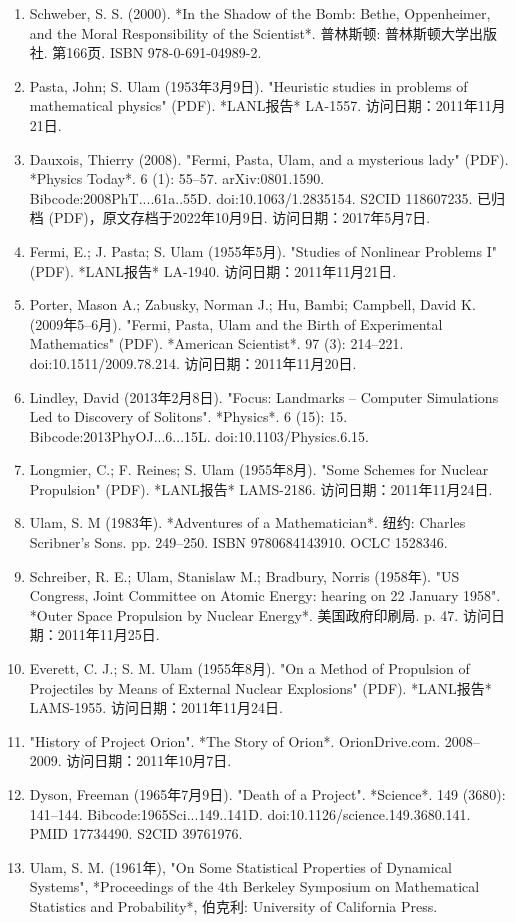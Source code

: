 \begin{enumerate}
\item Schweber, S. S. (2000). *In the Shadow of the Bomb: Bethe, Oppenheimer, and the Moral Responsibility of the Scientist*. 普林斯顿: 普林斯顿大学出版社. 第166页. ISBN 978-0-691-04989-2.
\item Pasta, John; S. Ulam (1953年3月9日). "Heuristic studies in problems of mathematical physics" (PDF). *LANL报告* LA-1557. 访问日期：2011年11月21日.
\item Dauxois, Thierry (2008). "Fermi, Pasta, Ulam, and a mysterious lady" (PDF). *Physics Today*. 6 (1): 55–57. arXiv:0801.1590. Bibcode:2008PhT....61a..55D. doi:10.1063/1.2835154. S2CID 118607235. 已归档 (PDF)，原文存档于2022年10月9日. 访问日期：2017年5月7日.
\item Fermi, E.; J. Pasta; S. Ulam (1955年5月). "Studies of Nonlinear Problems I" (PDF). *LANL报告* LA-1940. 访问日期：2011年11月21日.
\item Porter, Mason A.; Zabusky, Norman J.; Hu, Bambi; Campbell, David K. (2009年5–6月). "Fermi, Pasta, Ulam and the Birth of Experimental Mathematics" (PDF). *American Scientist*. 97 (3): 214–221. doi:10.1511/2009.78.214. 访问日期：2011年11月20日.
\item Lindley, David (2013年2月8日). "Focus: Landmarks – Computer Simulations Led to Discovery of Solitons". *Physics*. 6 (15): 15. Bibcode:2013PhyOJ...6...15L. doi:10.1103/Physics.6.15.
\item Longmier, C.; F. Reines; S. Ulam (1955年8月). "Some Schemes for Nuclear Propulsion" (PDF). *LANL报告* LAMS-2186. 访问日期：2011年11月24日.
\item Ulam, S. M (1983年). *Adventures of a Mathematician*. 纽约: Charles Scribner's Sons. pp. 249–250. ISBN 9780684143910. OCLC 1528346.
\item Schreiber, R. E.; Ulam, Stanislaw M.; Bradbury, Norris (1958年). "US Congress, Joint Committee on Atomic Energy: hearing on 22 January 1958". *Outer Space Propulsion by Nuclear Energy*. 美国政府印刷局. p. 47. 访问日期：2011年11月25日.
\item Everett, C. J.; S. M. Ulam (1955年8月). "On a Method of Propulsion of Projectiles by Means of External Nuclear Explosions" (PDF). *LANL报告* LAMS-1955. 访问日期：2011年11月24日.
\item "History of Project Orion". *The Story of Orion*. OrionDrive.com. 2008–2009. 访问日期：2011年10月7日.
\item Dyson, Freeman (1965年7月9日). "Death of a Project". *Science*. 149 (3680): 141–144. Bibcode:1965Sci...149..141D. doi:10.1126/science.149.3680.141. PMID 17734490. S2CID 39761976.
\item Ulam, S. M. (1961年), "On Some Statistical Properties of Dynamical Systems", *Proceedings of the 4th Berkeley Symposium on Mathematical Statistics and Probability*, 伯克利: University of California Press.
\end{enumerate}